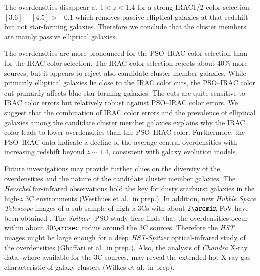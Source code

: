 \documentclass[mathleft,fleqn,%
]{an}
\begin{document}
The overdensities disappear at $1<z<1.4$ for a strong IRAC1/2 color
selection  $[3.6] - [4.5] > -0.1$ which removes passive elliptical galaxies at
that redshift but not star-forming galaxies. Therefore we conclude that
the cluster members are mainly passive elliptical galaxies.

The overdensities are more pronounced for the PSO--IRAC color
selection than for the IRAC color selection. 
The IRAC color selection rejects about 40\% more sources, but it appears to
reject also candidate cluster member galaxies. 
While primarily elliptical galaxies lie close to the IRAC color cuts,
the PSO--IRAC color cut primarily affects blue star forming
galaxies.
The cuts are quite sensitive to IRAC color errors but relatively
robust against PSO--IRAC color errors.
We suggest that the combination of IRAC color errors and the
prevalence of elliptical galaxies among the candidate cluster member
galaxies explains why the IRAC color leads to
lower overdensities than the 
PSO--IRAC color. 
Furthermore, the PSO--IRAC data indicate a decline of the average 
central overdensities with increasing redshift beyond $z \sim 1.4$,
consistent with galaxy evolution models.

Future investigations may provide further clues on the diversity of
the overdensities and the nature of the candidate cluster member galaxies. 
The {\it Herschel} far-infrared observations hold the key for dusty
starburst galaxies in the high-$z$ 3C environments (Westhues et al.\ in
prep.).
In addition, new {\it Hubble Space Telescope} images of a
sub-sample of high-$z$ 3Cs
with about 2$\arcmin$ FoV have been obtained \citep{Hilbert16}. 
The {\it Spitzer}$-$PSO study here finds that 
the overdensities occur within about 30$\arcsec$ radius
around the 3C sources. Therefore
the {\it HST} images might be large enough for a deep {\it HST-Spitzer}
optical-infrared study  of the overdensities (Ghaffari et
al.\  in prep.). 
Also, the analysis of {\it Chandra} X-ray data, where available for the 3C
sources, may reveal the extended 
hot X-ray gas characteristic of galaxy clusters (Wilkes et al.\ in prep).
\end{document}
